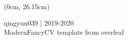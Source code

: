 \documentclass[a4paper]{friggeri-cv_reccius-experiment}
\begin{document}
\begin{textblock*}{\paperwidth}(0cm, 26.15cm)
  \begin{center}
      qingyun039 | 2019-2020\\
      ModernFancyCV template from overleaf
  \end{center}
\end{textblock*}
\end{document}
